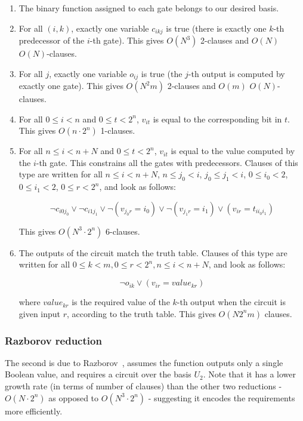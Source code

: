 \documentclass{article}
\begin{document}
\begin{enumerate}

  \item The binary function assigned to each gate belongs to our desired basis.
  \item For all $(i,k)$, exactly one variable $c_{ikj}$ is true (there is exactly one $k$-th predecessor of the $i$-th gate). This gives $O(N^3)$ 2-clauses and $O(N)$ $O(N)$-clauses.
  \item For all $j$, exactly one variable $o_{ij}$ is true (the $j$-th output is computed by exactly one gate). This gives $O(N^2m)$ 2-clauses and $O(m)$ $O(N)$-clauses.
  \item For all $0 \leq i < n$ and $0 \leq t < 2^n$, $v_{it}$ is equal to the corresponding bit in $t$. This gives $O(n \cdot 2^n)$ 1-clauses.
  \item For all $n \leq i < n + N$ and $0 \leq t < 2^n$, $v_{it}$ is equal to the value computed by the $i$-th gate. This constrains all the gates with predecessors. Clauses of this type are written for all $n \leq i < n + N$, $n \leq j_0 < i$, $j_0 \leq j_1 < i$, $0 \leq i_0 < 2$, $0 \leq i_1 < 2$, $0 \leq r < 2^n$, and look as follows: 

  \[
    \neg c_{i0j_0} \lor \neg c_{i1j_1} \lor \neg(v_{j_0r} = i_0) \lor \neg(v_{j_1r} = i_1) \lor (v_{ir} = t_{ii_0i_1})
  \]

  This gives $O(N^3 \cdot 2^n)$ 6-clauses.
  \item The outputs of the circuit match the truth table. Clauses of this type are written for all $0 \leq k < m, 0 \leq r < 2^n, n \leq i < n + N$, and look as follows:
 
  \[
    \neg o_{ik} \lor (v_{ir} = value_{kr})
  \] 

  where $value_{kr}$ is the required value of the $k$-th output when the circuit is given input $r$, according to the truth table. This gives $O(N2^nm)$ clauses.

\end{enumerate}


\subsubsection{Razborov reduction}

The second is due to Razborov~\cite{raz}, assumes the function outputs only a single Boolean value, and requires a circuit over the basis \(U_2\). Note that it has a lower growth rate (in terms of number of clauses) than the other two reductions - $O(N \cdot 2^n)$ as opposed to $O(N^3 \cdot 2^n)$ - suggesting it encodes the requirements more efficiently.
\end{document}
